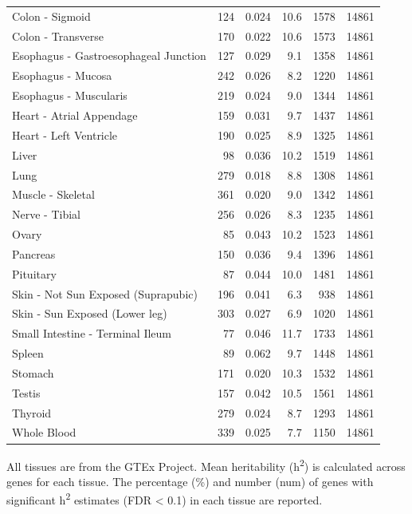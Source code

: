 \documentclass[10pt,letterpaper]{article}
\begin{document}
\begin{table}[!ht]
\begin{adjustwidth}{-2.25in}{0in}
\begin{tabular}{lrrrrr}
  Colon - Sigmoid & 124 & 0.024 & 10.6 & 1578 & 14861 \\ 
  Colon - Transverse & 170 & 0.022 & 10.6 & 1573 & 14861 \\ 
  Esophagus - Gastroesophageal Junction & 127 & 0.029 & 9.1 & 1358 & 14861 \\ 
  Esophagus - Mucosa & 242 & 0.026 & 8.2 & 1220 & 14861 \\ 
  Esophagus - Muscularis & 219 & 0.024 & 9.0 & 1344 & 14861 \\ 
  Heart - Atrial Appendage & 159 & 0.031 & 9.7 & 1437 & 14861 \\ 
  Heart - Left Ventricle & 190 & 0.025 & 8.9 & 1325 & 14861 \\ 
  Liver & 98 & 0.036 & 10.2 & 1519 & 14861 \\ 
  Lung & 279 & 0.018 & 8.8 & 1308 & 14861 \\ 
  Muscle - Skeletal & 361 & 0.020 & 9.0 & 1342 & 14861 \\ 
  Nerve - Tibial & 256 & 0.026 & 8.3 & 1235 & 14861 \\ 
  Ovary & 85 & 0.043 & 10.2 & 1523 & 14861 \\ 
  Pancreas & 150 & 0.036 & 9.4 & 1396 & 14861 \\ 
  Pituitary & 87 & 0.044 & 10.0 & 1481 & 14861 \\ 
  Skin - Not Sun Exposed (Suprapubic) & 196 & 0.041 & 6.3 & 938 & 14861 \\ 
  Skin - Sun Exposed (Lower leg) & 303 & 0.027 & 6.9 & 1020 & 14861 \\ 
  Small Intestine - Terminal Ileum & 77 & 0.046 & 11.7 & 1733 & 14861 \\ 
  Spleen & 89 & 0.062 & 9.7 & 1448 & 14861 \\ 
  Stomach & 171 & 0.020 & 10.3 & 1532 & 14861 \\ 
  Testis & 157 & 0.042 & 10.5 & 1561 & 14861 \\ 
  Thyroid & 279 & 0.024 & 8.7 & 1293 & 14861 \\ 
  Whole Blood & 339 & 0.025 & 7.7 & 1150 & 14861 \\ 
   \hline
\end{tabular}
\begin{flushleft} All tissues are from the GTEx Project. Mean heritability (h\textsuperscript{2}) is calculated across genes for each tissue. The percentage (\%) and number (num) of genes with significant h\textsuperscript{2} estimates (FDR \textless{} 0.1) in each tissue are reported. \end{flushleft}
\end{adjustwidth}
\end{table}
\end{document}
